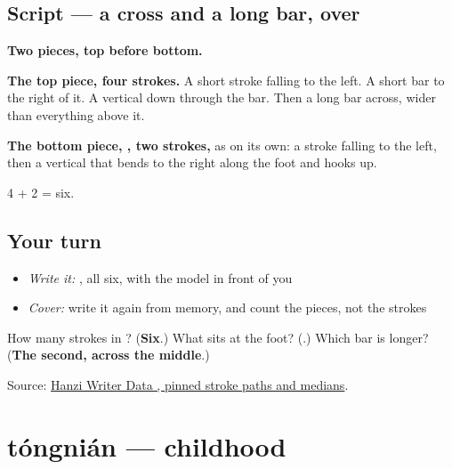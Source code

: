 \subsection*{Script — a cross and a long bar, over }

\begin{quote}
\end{quote}

\textbf{Two pieces, top before bottom.}

\textbf{The top piece, four strokes.} A short stroke falling to the left. A short bar to the right of it. A vertical down through the bar. Then a long bar across, wider than everything above it.

\textbf{The bottom piece, , two strokes,} as on its own: a stroke falling to the left, then a vertical that bends to the right along the foot and hooks up.

4 + 2 = six.

\subsection*{Your turn}
\begin{itemize}
\raggedright
  \item \emph{Write it:} , all six, with the model in front of you
  \item \emph{Cover:} write it again from memory, and count the pieces, not the strokes
\end{itemize}

\begin{tcolorbox}[breakable,colback=teal!4,colframe=teal!35!black,title={Before you move on}]
How many strokes in ? (\textbf{Six}.) What sits at the foot? (\textbf{}.) Which bar is longer? (\textbf{The second, across the middle}.)

Source: \href{https://raw.githubusercontent.com/chanind/hanzi-writer-data/68d10a4b21150cae5e1ebbd223eed289cf32d90c/data/\%E5\%85\%88.json}{Hanzi Writer Data , pinned stroke paths and medians}.
\end{tcolorbox}
\section[tóngnián]{tóngnián — childhood}

\label{lesson:ZH-C269-tongnian}



